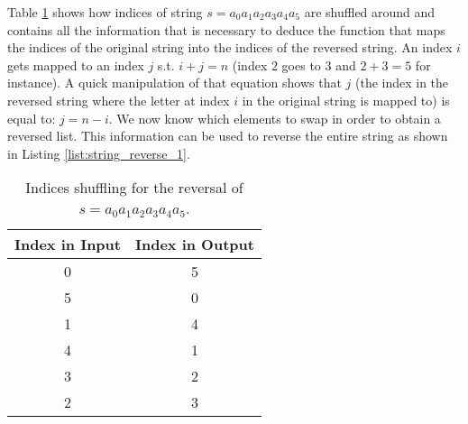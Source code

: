 Table \ref{tab:string_reverse:shuffle} shows how indices of string $s=a_0 a_1 a_2 a_3 a_4 a_5$ are shuffled around and contains all the information that is necessary to deduce the function that maps the indices of the original string into the indices of the reversed string.
An index $i$ gets mapped to an index $j$ s.t. $i+j = n$ (index $2$ goes to $3$ and $2+3=5$ for instance).
A quick manipulation of that equation shows that $j$ (the index in the reversed string where the letter at index $i$ in the original string is mapped to) is equal to: $j = n-i$.
We now know which elements to swap in order to obtain a reversed list. This information can be used to reverse the entire string as shown in Listing \ref{list:string_reverse_1}.

\begin{table}[]
	\centering
	\begin{tabular}{|c|c|}
		\hline
		\multicolumn{1}{|l|}{Index in Input} & \multicolumn{1}{l|}{Index in Output} \\ \hline
		0                                    & 5                                    \\ \hline
		5                                    & 0                                    \\ \hline
		1                                    & 4                                    \\ \hline
		4                                    & 1                                    \\ \hline
		3                                    & 2                                    \\ \hline
		2                                    & 3                                    \\ \hline
	\end{tabular}
	\caption{Indices shuffling for the reversal of $s=a_0 a_1 a_2 a_3 a_4 a_5$.}
	\label{tab:string_reverse:shuffle}
\end{table}




